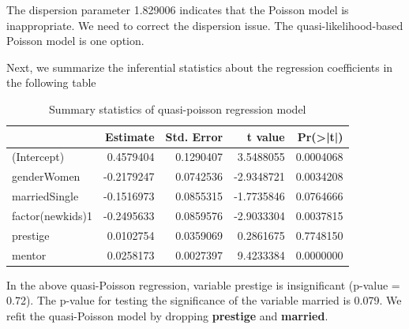 \documentclass[
]{book}
\newenvironment{Shaded}{\begin{snugshade}}{\end{snugshade}}
\newcommand{\AttributeTok}[1]{\textcolor[rgb]{0.13,0.29,0.53}{#1}}
\newcommand{\FloatTok}[1]{\textcolor[rgb]{0.00,0.00,0.81}{#1}}
\newcommand{\FunctionTok}[1]{\textcolor[rgb]{0.13,0.29,0.53}{\textbf{#1}}}
\newcommand{\NormalTok}[1]{#1}
\newcommand{\OtherTok}[1]{\textcolor[rgb]{0.56,0.35,0.01}{#1}}
\newcommand{\SpecialCharTok}[1]{\textcolor[rgb]{0.81,0.36,0.00}{\textbf{#1}}}
\newcommand{\StringTok}[1]{\textcolor[rgb]{0.31,0.60,0.02}{#1}}
\begin{document}
The dispersion parameter 1.829006 indicates that the Poisson model is inappropriate. We need to correct the dispersion issue. The quasi-likelihood-based Poisson model is one option.

Next, we summarize the inferential statistics about the regression coefficients in the following table

\begin{Shaded}
\end{Shaded}

\begin{table}

\caption{\label{tab:unnamed-chunk-180}Summary statistics of quasi-poisson regression model}
\centering
\begin{tabular}[t]{l|r|r|r|r}
\hline
  & Estimate & Std. Error & t value & Pr(>|t|)\\
\hline
(Intercept) & 0.4579404 & 0.1290407 & 3.5488055 & 0.0004068\\
\hline
genderWomen & -0.2179247 & 0.0742536 & -2.9348721 & 0.0034208\\
\hline
marriedSingle & -0.1516973 & 0.0855315 & -1.7735846 & 0.0764666\\
\hline
factor(newkids)1 & -0.2495633 & 0.0859576 & -2.9033304 & 0.0037815\\
\hline
prestige & 0.0102754 & 0.0359069 & 0.2861675 & 0.7748150\\
\hline
mentor & 0.0258173 & 0.0027397 & 9.4233384 & 0.0000000\\
\hline
\end{tabular}
\end{table}

In the above quasi-Poisson regression, variable prestige is insignificant (p-value = 0.72). The p-value for testing the significance of the variable married is 0.079. We refit the quasi-Poisson model by dropping \textbf{prestige} and \textbf{married}.

\begin{Shaded}
\end{Shaded}
\end{document}
